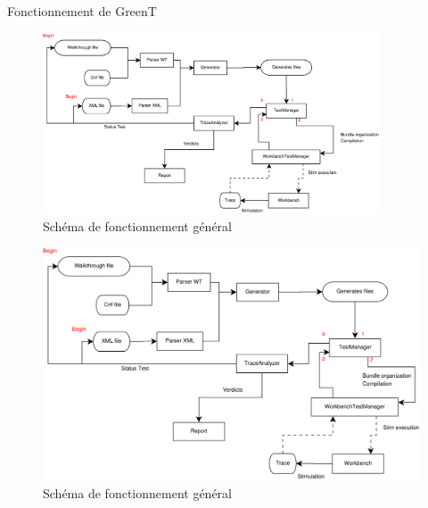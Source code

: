 \documentclass{beamer}
\begin{document}
\begin{frame}{Fonctionnement de GreenT}
	\only<1> {
	\begin{figure}[H]
		\includegraphics[width=10cm]{generalDiag.eps}
		\caption{Schéma de fonctionnement général}
	\end{figure}
	}
	 {
	\begin{figure}[H]
		\hspace{-88px}
		\includegraphics[width=12.4cm]{generalDiag-eps-converted-to.pdf}
		\caption{Schéma de fonctionnement général}
	\end{figure}
	}	
\end{frame}
\end{document}
